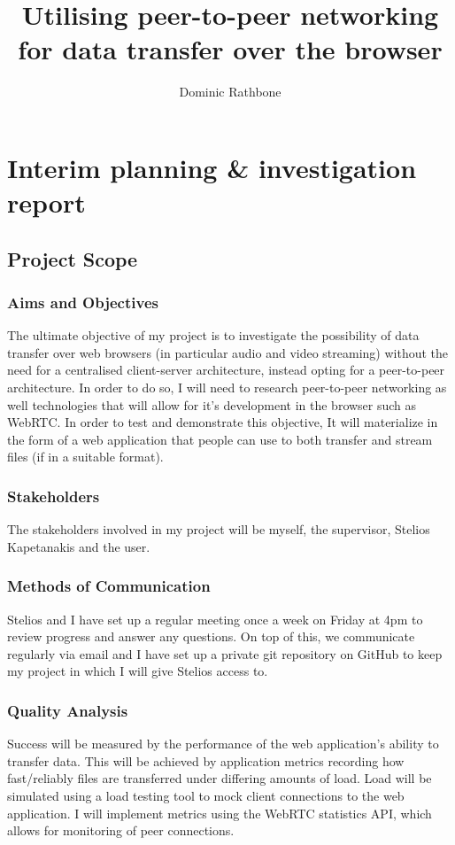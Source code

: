 \documentclass[]{report}
\title{Utilising peer-to-peer networking for data transfer over the browser}
\author{Dominic Rathbone}
\begin{document}
\maketitle
\tableofcontents
\listoftodos


\chapter{Interim planning \& investigation report}
	\section{Project Scope}
		\subsection*{Aims and Objectives}
			The ultimate objective of my project is to investigate the possibility of data transfer over web browsers (in particular audio and video streaming) without the need for a centralised client-server architecture, instead opting for a peer-to-peer architecture. In order to do so, I will need to research peer-to-peer networking as well technologies that will allow for it's development in the browser such as WebRTC. In order to test and demonstrate this objective, It will materialize in the form of a web application that people can use to both transfer and stream files (if in a suitable format).
		\subsection*{Stakeholders}
			The stakeholders involved in my project will be myself, the supervisor, Stelios Kapetanakis and the user.
		\subsection*{Methods of Communication}
			Stelios and I have set up a regular meeting once a week on Friday at 4pm to review progress and answer any questions. On top of this, we communicate regularly via email and I have set up a private git repository on GitHub to keep my project in which I will give Stelios access to.
		\subsection*{Quality Analysis}
			Success will be measured by the performance of the web application's ability to transfer data. This will be achieved by application metrics recording how fast/reliably files are transferred under differing amounts of load. Load will be simulated using a load testing tool to mock client connections to the web application. I will implement metrics using the WebRTC statistics API, which allows for monitoring of peer connections.
			
\end{document}

